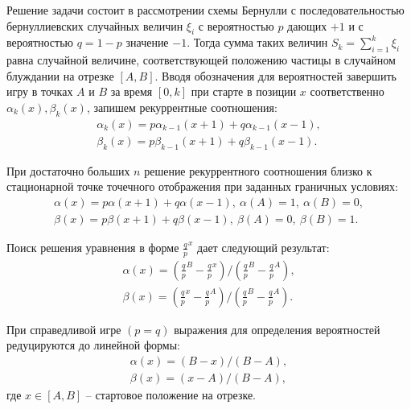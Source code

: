 Решение задачи состоит в рассмотрении схемы Бернулли с последовательностью бернуллиевских случайных величин $\xi_i$ с вероятностью $p$ дающих $+1$ и с вероятностью $q=1-p$ значение $-1$. Тогда сумма таких величин $S_k=\sum_{i=1}^{k} \xi_i$ равна случайной величине, соответствующей положению частицы в случайном блуждании на отрезке $[A, B]$. Вводя обозначения для вероятностей завершить игру в точках $A$ и $B$ за время $[0, k]$ при старте в позиции $x$ соответственно $\alpha_k(x), \beta_k(x)$, запишем рекуррентные соотношения:
\begin{equation}
    \label{eq:eq1}
    \begin{alignedat}{2}
        \alpha_k(x) = p\alpha_{k-1}(x+1)+q\alpha_{k-1}(x-1),\\
        \beta_k(x) = p\beta_{k-1}(x+1)+q\beta_{k-1}(x-1).
    \end{alignedat}
\end{equation}

При достаточно больших $n$ решение рекуррентного соотношения близко к стационарной точке точечного отображения при заданных граничных условиях:
\begin{equation}
    \label{eq:eq2}
    \begin{alignedat}{2}
        \alpha(x) = p\alpha(x+1)+q\alpha(x-1), \: \alpha(A)=1, \: \alpha(B)=0,\\
        \beta(x) = p\beta(x+1)+q\beta(x-1), \: \beta(A)=0, \: \beta(B)=1.
    \end{alignedat}
\end{equation}

Поиск решения уравнения в форме $\frac{q}{p}^{x}$ дает следующий результат:
\begin{equation}
    \label{eq:eq3}
    \begin{alignedat}{2}
        \alpha(x) = \left (\frac{q}{p}^B-\frac{q}{p}^x\right ) \Bigg / \left (\frac{q}{p}^B-\frac{q}{p}^A\right ),\\
        \beta(x) = \left (\frac{q}{p}^x-\frac{q}{p}^A\right ) \Bigg / \left (\frac{q}{p}^B-\frac{q}{p}^A\right ).
    \end{alignedat}
\end{equation}

При справедливой игре $(p=q)$ выражения для определения вероятностей редуцируются до линейной формы:
\begin{equation}
    \label{eq:eq4}
    \begin{alignedat}{2}
        \alpha(x) = \left (B-x\right )/\left (B-A\right ),\\
        \beta(x) = \left (x-A\right )/\left (B-A\right ),
    \end{alignedat}
\end{equation}
где $x \in [A, B]$ -- стартовое положение на отрезке.

